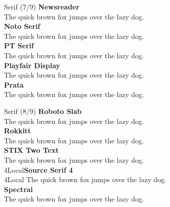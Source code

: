 \documentclass[10pt]{beamer}
\begin{document}
\begin{frame}{Serif (7/9)}
\vspace{-0.2cm}
  {\NewsreaderLocal\Large\bfseries Newsreader\\}
  {\NewsreaderLocal The quick brown fox jumps over the lazy dog.\\[0.3cm]}
  {\NotoSerifLocal\Large\bfseries Noto Serif\\}
  {\NotoSerifLocal The quick brown fox jumps over the lazy dog.\\[0.3cm]}
  {\PTSerifLocal\Large\bfseries PT Serif\\}
  {\PTSerifLocal The quick brown fox jumps over the lazy dog.\\[0.3cm]}
  {\PlayfairDisplayLocal\Large\bfseries Playfair Display\\}
  {\PlayfairDisplayLocal The quick brown fox jumps over the lazy dog.\\[0.3cm]}
  {\PrataLocal\Large\bfseries Prata\\}
  {\PrataLocal The quick brown fox jumps over the lazy dog.\\[0.3cm]}
\end{frame}

\begin{frame}{Serif (8/9)}
\vspace{-0.2cm}
  {\RobotoSlabLocal\Large\bfseries Roboto Slab\\}
  {\RobotoSlabLocal The quick brown fox jumps over the lazy dog.\\[0.3cm]}
  {\RokkittLocal\Large\bfseries Rokkitt\\}
  {\RokkittLocal The quick brown fox jumps over the lazy dog.\\[0.3cm]}
  {\STIXTwoTextLocal\Large\bfseries STIX Two Text\\}
  {\STIXTwoTextLocal The quick brown fox jumps over the lazy dog.\\[0.3cm]}
  {\SourceSerif4Local\Large\bfseries Source Serif 4\\}
  {\SourceSerif4Local The quick brown fox jumps over the lazy dog.\\[0.3cm]}
  {\SpectralLocal\Large\bfseries Spectral\\}
  {\SpectralLocal The quick brown fox jumps over the lazy dog.\\[0.3cm]}
\end{frame}
\end{document}
